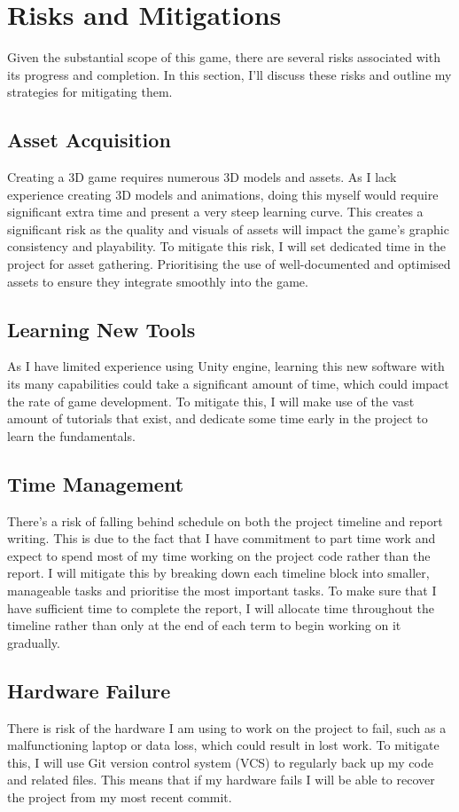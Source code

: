\documentclass[12pt]{article}
\begin{document}
\section{Risks and Mitigations}
Given the substantial scope of this game, there are several risks associated with its progress and completion. In this section, I'll discuss these risks and outline my strategies for mitigating them.

\subsection{Asset Acquisition}
Creating a 3D game requires numerous 3D models and assets. As I lack experience creating 3D models and animations, doing this myself would require significant extra time and present a very steep learning curve. This creates a significant risk as the quality and visuals of assets will impact the game’s graphic consistency and playability. To mitigate this risk, I will set dedicated time in the project for asset gathering. Prioritising the use of well-documented and optimised assets to ensure they integrate smoothly into the game.
\subsection{Learning New Tools}
As I have limited experience using Unity engine, learning this new software with its many capabilities could take a significant amount of time, which could impact the rate of game development. To mitigate this, I will make use of the vast amount of tutorials that exist, and dedicate some time early in the project to learn the fundamentals.
\subsection{Time Management}
There's a risk of falling behind schedule on both the project timeline and report writing. This is due to the fact that I have commitment to part time work and expect to spend most of my time working on the project code rather than the report. I will mitigate this by breaking down each timeline block into smaller, manageable tasks and prioritise the most important tasks. To make sure that I have sufficient time to complete the report, I will allocate time throughout the timeline rather than only at the end of each term to begin working on it gradually.
\subsection{Hardware Failure}
There is risk of the hardware I am using to work on the project to fail, such as a malfunctioning laptop or data loss, which could result in lost work.  To mitigate this, I will use Git version control system (VCS) to regularly back up my code and related files. This means that if my hardware fails I will be able to recover the project from my most recent commit.
\end{document}
